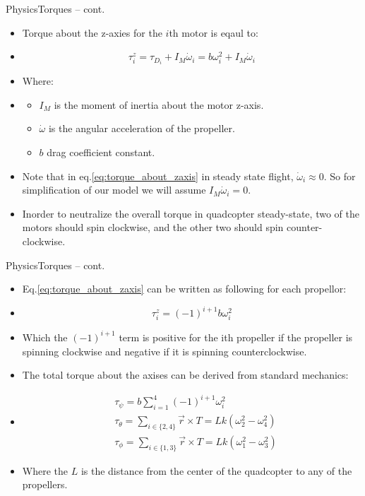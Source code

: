 \documentclass[8pt]{beamer}
\newcommand{\Ytri}{$\triangleright$ }
\renewcommand{\|}[1][.3em]{\hspace{#1}|\hspace{#1}}
\renewcommand{\,}[1][.3em]{,\hspace{#1}}
\newcommand{\subitem}{\item[\Ytri]}
\begin{document}
\begin{frame}{Physics}{Torques -- cont.}
    \begin{itemize}
    \item Torque about the z-axies for the $i$th motor is eqaul to:
    \item[] \begin{equation}
    \tau_i^z = \tau_{D_i} + I_M\dot{\omega}_i = b\omega_i^2 + I_M\dot{\omega}_i
    \label{eq:torque_about_zaxis}
    \end{equation}
    \pause
    \item Where:
    \item[] \begin{itemize}
        \subitem $I_M$ is the moment of inertia about the motor z-axis.
        \subitem $\dot{\omega}$ is the angular acceleration of the propeller.
        \subitem $b$ drag coefficient constant.
    \end{itemize}
    \pause
    \item Note that in eq.\ref{eq:torque_about_zaxis} in steady state flight, $\dot{\omega}_i \approx 0$. So for simplification of our model we will assume $I_M\dot{\omega}_i = 0$.
    \pause
    \item Inorder to neutralize the overall torque in quadcopter steady-state, two of the motors should spin clockwise, and the other two should spin counter-clockwise.
    \end{itemize}
\end{frame}

\begin{frame}{Physics}{Torques -- cont.}
    \begin{itemize}
    \item Eq.\ref{eq:torque_about_zaxis} can be written as following for each propellor:
    \item[] \begin{equation}
    \tau_i^z = (-1)^{i+1}b\omega_i^2
    \end{equation}
    \item Which the $(-1)^{i+1}$ term is positive for the ith propeller if the propeller is spinning clockwise and negative if it is spinning counterclockwise.
    \pause
    \item The total torque about the axises can be derived from standard mechanics:
    \item[] \begin{align}
    &\tau_\psi = b\sum_{i=1}^4 (-1)^{i+1}\omega_i^2\label{eq:total_torque_z}\\
    &\tau_\theta = \sum_{i \in \{2, 4\}} \vec{r} \times T = Lk(\omega_2^2 - \omega_4^2)\label{eq:total_torque_y}\\
    &\tau_\phi = \sum_{i \in \{1, 3\}} \vec{r} \times T = Lk(\omega_1^2 - \omega_3^2)\label{eq:total_torque_x}
    \end{align}
    \item Where the $L$ is the distance from the center of the quadcopter to any of the propellers.
    \end{itemize}
\end{frame}
\end{document}
